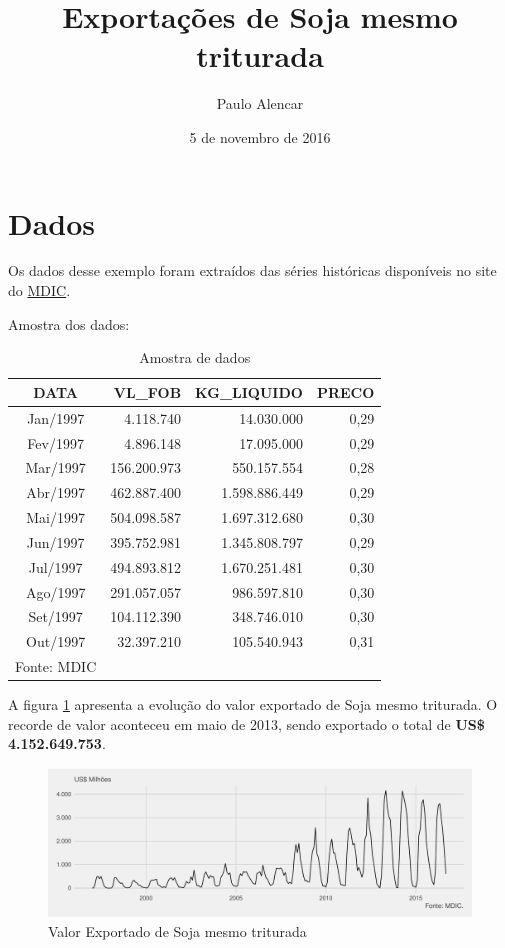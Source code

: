 \documentclass[portuguese,]{article}
\title{Exportações de Soja mesmo triturada}
\author{Paulo Alencar}
\date{5 de novembro de 2016}
\begin{document}
\maketitle

\section{Dados}\label{dados}

Os dados desse exemplo foram extraídos das séries históricas disponíveis
no site do \href{www.mdic.gov.br}{MDIC}.

Amostra dos dados:

\begin{table}[ht]
\centering
\caption{Amostra de dados} 
\begin{tabular}{crrr}
  \hline
DATA & VL\_FOB & KG\_LIQUIDO & PRECO \\ 
  \hline
Jan/1997 &     4.118.740 &     14.030.000 & 0,29 \\ 
  Fev/1997 &     4.896.148 &     17.095.000 & 0,29 \\ 
  Mar/1997 &   156.200.973 &    550.157.554 & 0,28 \\ 
  Abr/1997 &   462.887.400 &  1.598.886.449 & 0,29 \\ 
  Mai/1997 &   504.098.587 &  1.697.312.680 & 0,30 \\ 
  Jun/1997 &   395.752.981 &  1.345.808.797 & 0,29 \\ 
  Jul/1997 &   494.893.812 &  1.670.251.481 & 0,30 \\ 
  Ago/1997 &   291.057.057 &    986.597.810 & 0,30 \\ 
  Set/1997 &   104.112.390 &    348.746.010 & 0,30 \\ 
  Out/1997 &    32.397.210 &    105.540.943 & 0,31 \\ 
   \hline \multicolumn{1}{l}{\scriptsize{Fonte: MDIC}} \\\end{tabular}
\end{table}

A figura \ref{fig:fig1} apresenta a evolução do valor exportado de Soja
mesmo triturada. O recorde de valor aconteceu em maio de 2013, sendo
exportado o total de \textbf{US\$ 4.152.649.753}.

\begin{figure}[H]
\includegraphics{exemplo_pdf_files/figure-latex/fig1-1} \caption{Valor Exportado de Soja mesmo triturada}\label{fig:fig1}
\end{figure}
\end{document}
